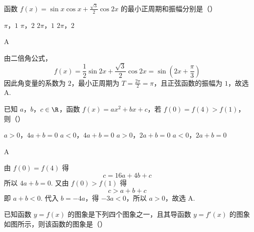 \begin{problem}
函数 \( f(x) = \sin x\cos x + \frac{\sqrt{3}}{2}\cos 2x \) 的最小正周期和振幅分别是（\quad）

\choices
    {\(\pi\)，\(1\)}
    {\(\pi\)，\(2\)}
    {\(2\pi\)，\(1\)}
    {\(2\pi\)，\(2\)}

\end{problem}

\begin{answer}
A
\end{answer}

\begin{solution}
由二倍角公式，
\[
f(x)=\frac{1}{2}\sin2x+\frac{\sqrt3}{2}\cos2x=\sin\left(2x+\frac{\pi}{3}\right)
\]
因此角变量的系数为 \(2\)，最小正周期为 \(T=\frac{2\pi}{2}=\pi\)，且正弦函数的振幅为 \(1\)，故选 A.
\end{solution}

\begin{problem}
已知 \(a\)，\(b\)，\(c \in \R\)，函数 \(f(x) = ax^2 + bx + c\)，若 \(f(0) = f(4) > f(1)\)，则（\quad）

\choices
    {\(a > 0\)，\(4a + b = 0\)}
    {\(a < 0\)，\(4a + b = 0\)}
    {\(a > 0\)，\(2a + b = 0\)}
    {\(a < 0\)，\(2a + b = 0\)}

\end{problem}

\begin{answer}
A
\end{answer}

\begin{solution}
由 \(f(0)=f(4)\) 得
\[
c=16a+4b+c
\]
所以 \(4a+b=0\). 又由 \(f(0)>f(1)\) 得
\[
c>a+b+c
\]
即 \(a+b<0\). 代入 \(b=-4a\)，得 \(-3a<0\)，所以 \(a>0\)，故选 A.
\end{solution}

\begin{problem}
已知函数 \( y = f(x) \) 的图象是下列四个图象之一，且其导函数 \( y = f'(x) \) 的图象如图所示，则该函数的图象是（\quad）


    {}
    {}
    {}

\end{problem}

